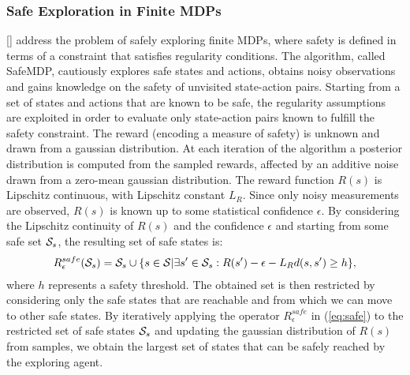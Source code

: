 \subsubsection{Safe Exploration in Finite \ac{MDPs}} \label{subsec:fmdp}
[\cite{turchetta2016}] address the problem of safely exploring finite \ac{MDPs}, where safety is defined in terms of a constraint that satisfies regularity conditions. The algorithm, called SafeMDP, cautiously explores safe states and actions, obtains noisy observations and gains knowledge on the safety of unvisited state-action pairs.
Starting from a set of states and actions that are known to be safe, the regularity assumptions are exploited in order to evaluate only state-action pairs known to fulfill the safety constraint.
The reward (encoding a measure of safety) is unknown and drawn from a gaussian distribution. At each iteration of the algorithm a posterior distribution is computed from the sampled rewards, affected by an additive noise drawn from a zero-mean gaussian distribution. The reward function $R(s)$ is Lipschitz continuous, with Lipschitz constant $L_{R}$. Since only noisy measurements are observed, $R(s)$ is known up to some statistical confidence $\epsilon$. By considering the Lipschitz continuity of $R(s)$ and the confidence $\epsilon$ and starting from some safe set $\mathcal{S}_s$, the resulting set of safe states is:
\begin{align}
R_{\epsilon}^{safe}(\mathcal{S}_s) = \mathcal{S}_s \cup \{s \in \mathcal{S} | \exists s' \in \mathcal{S}_s: R(s') - \epsilon - L_{R} d(s, s') \geq h\}, \label{eq:safe}
\end{align}
where $h$ represents a safety threshold. The obtained set is then restricted by considering only the safe states that are reachable and from which we can move to other safe states.
By iteratively applying the operator $R_{\epsilon}^{safe}$ in (\ref{eq:safe}) to the restricted set of safe states $\mathcal{S}_s$ and updating the gaussian distribution of $R(s)$ from samples, we obtain the largest set of states that can be safely reached by the exploring agent.

